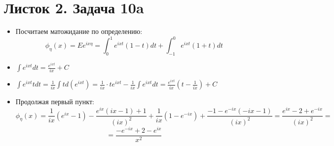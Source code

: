 \section{Листок 2. Задача 10a}
\begin{itemize}
\item Посчитаем матожидание по определению:
\[
    \phi_{\eta}\left(x\right) = E e ^ {ix\eta} = \int_{0}^{1} e ^ {ixt} \left(1 - t\right) dt + \int_{-1}^{0} e ^ {ixt} \left(1 + t\right) dt
\]
\item $\int e ^ {ixt} dt = \frac{e ^ {ixt}}{ix} + C$
\item $\int e ^ {ixt} t dt = \frac{1}{ix} \int t d\left(e ^ {ixt}\right) = \frac{1}{ix} \cdot t e ^ {ixt} - \frac{1}{ix} \int e ^ {ixt} dt = \frac{e ^ {ixt}}{ix} \left(t - \frac{1}{ix}\right) + C$
\item Продолжая первый пункт: 
\[
    \phi_{\eta}\left(x\right) = \frac{1}{ix} \left(e ^ {ix} - 1\right) - \frac{e ^ {ix} \left(ix - 1\right) + 1}{\left(ix\right) ^ 2} + \frac{1}{ix} \left(1 - e ^ {-ix}\right) + \frac{-1 - e ^ {-ix} \left(-ix - 1\right)}{\left(ix\right) ^ 2}
    = \frac{e ^ {ix} - 2 + e ^ {-ix}}{\left(ix\right) ^ 2}=
\]
\[
   =\frac{-e ^ {-ix} + 2 - e ^ {ix}}{x ^ 2} 
\]
\end{itemize}

